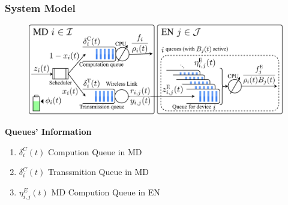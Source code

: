 \begin{frame}
	\frametitle{System Model}
	
	\begin{figure}
		\captionsetup{name=Fig.}
		\centering
		\includegraphics[width=1\linewidth]{queue}
		\vspace*{-5mm}
		\vspace*{-3mm}
		\label{fig1}
	\end{figure}
	
	\vfill
	
	\textbf{Queues' Information}\vspace{2mm}
	
	\begin{enumerate}[$\bullet$]
		
		\item $\delta^C_i(t)$  Compution Queue in MD
		\item $\delta^C_i(t)$  Transsmition Queue in MD
		\item $\eta^E_{i,j}(t)$  MD Compution Queue in EN
		
	\end{enumerate}
	
	
\end{frame}



